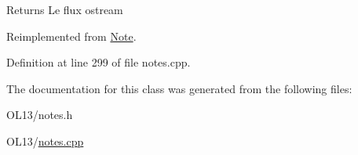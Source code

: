 \begin{DoxyReturn}{Returns}
Le flux ostream 
\end{DoxyReturn}


Reimplemented from \hyperlink{class_note_a1bd4acfbde0b71d05fd7d4ca889bca2b}{Note}.



Definition at line 299 of file notes.\+cpp.



The documentation for this class was generated from the following files\+:\begin{DoxyCompactItemize}
\item 
O\+L13/notes.\+h\item 
O\+L13/\hyperlink{notes_8cpp}{notes.\+cpp}\end{DoxyCompactItemize}
